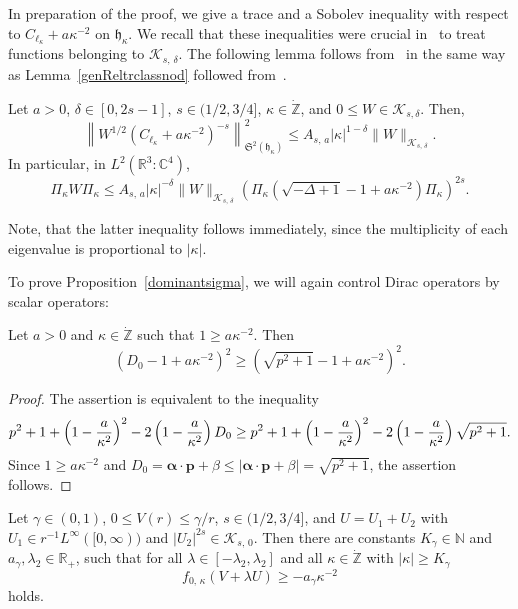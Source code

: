 \documentclass[AHL,Unicode,longabstracts,published]{cedram}
\newcommand*\cz{\mathbb{C}}
\newcommand*\nz{\mathbb{N}}
\newcommand*\gz{\mathbb{Z}}
\newcommand*\rz{\mathbb{R}}
\newcommand*\zp{\dot{\gz}}
\newcommand*\cK{\mathcal{K}}
\newcommand*\gh{\mathfrak{h}}
\newcommand*\gS{\mathfrak{S}}
\newcommand*\balpha{\bm{\alpha}}
\newcommand*\bp{\bm{p}}
\begin{document}
In preparation of the proof, we give a trace and a Sobolev inequality with respect to $C_{\ell_\kappa}+a \kappa^{-2}$ on $\gh_\kappa$. We recall that these inequalities were crucial in~\cite{Franketal2020P} to treat functions belonging to $\cK_{s,\,\delta}$. The following lemma follows from~\cite[Proposition~5.2]{Franketal2020P} in the same way as Lemma~\ref{genReltrclassnod} followed from~\cite[Proposition~4.4]{Franketal2020P}.

\begin{lemm}\label{genReltrclass}
Let $a>0$, $\delta\in[0,2s-1]$, $s\in(1/2,3/4]$, $\kappa\in\zp$, and $0\leq W \in\cK_{s,\delta}$. Then,
\begin{equation}\label{eq:genReltrclass}
\left\|W^{1/2}\left(C_{\ell_\kappa}+a\kappa^{-2}\right)^{-s}\right\|_{\gS^2\left(\gh_{\kappa}\right)}^2
\leq A_{s,\,a} |\kappa|^{1-\delta}\|W\|_{\cK_{s,\,\delta}}.
\end{equation}
In particular, in $L^2(\rz^3:\cz^4)$,
\begin{equation}\label{eq:genSobolevDual}
\Pi_{\kappa}W\Pi_{\kappa}
\leq A_{s,\,a} |\kappa|^{-\delta}\|W\|_{\cK_{s,\,\delta}} \left(\Pi_{\kappa}\left(\sqrt{-\Delta+1}-1+a\kappa^{-2}\right)\Pi_{\kappa}\right)^{2s}.
\end{equation}
\end{lemm}

Note, that the latter inequality follows immediately, since the multiplicity of each eigenvalue is proportional to $|\kappa|$.

To prove Proposition~\ref{dominantsigma}, we will again control Dirac operators by scalar operators:
\begin{lemm}\label{boundkineticenergy}
Let $a>0$ and $\kappa\in\zp$ such that $1\geq a \kappa^{-2}$. Then
\[
\left(D_0-1+a \kappa^{-2}\right)^2 \geq \left(\sqrt{p^2+1}-1+a \kappa^{-2}\right)^2.
\]
\end{lemm}

\begin{proof}
The assertion is equivalent to the inequality
\[
p^2+1+\left(1-\frac a{\kappa^2}\right)^2-2\left(1-\frac a{\kappa^2}\right)D_0\\
\geq p^2+1+\left(1-\frac a{\kappa^2}\right)^2-2\left(1-\frac a{\kappa^2}\right)\sqrt{p^2+1}.
\]
Since $1\geq a \kappa^{-2}$ and $D_0=\balpha\cdot\bp+\beta \leq |\balpha\cdot\bp+\beta|=\sqrt{p^2+1}$, the assertion follows.
\end{proof}

\begin{lemm}\label{boundA}
Let $\gamma\in(0,1)$, $0\leq V(r)\leq\gamma/r$, $s\in(1/2,3/4]$, and $U=U_1+U_2$ with $U_1\in r^{-1}L^\infty([0,\infty))$ and $|U_2|^{2s}\in \cK_{s,\,0}$. Then there are constants $K_{\gamma}\in\nz$ and $a_\gamma,\lambda_2\in \rz_+$, such that for all $\lambda\in[-\lambda_2, \lambda_2]$ and all $\kappa\in\zp$ with $|\kappa|\geq K_\gamma$
\begin{equation}\label{agamma}
f_{0,\,\kappa}(V+\lambda U) \geq -a_\gamma \kappa^{-2}
\end{equation}
holds.
\end{lemm}
\end{document}
